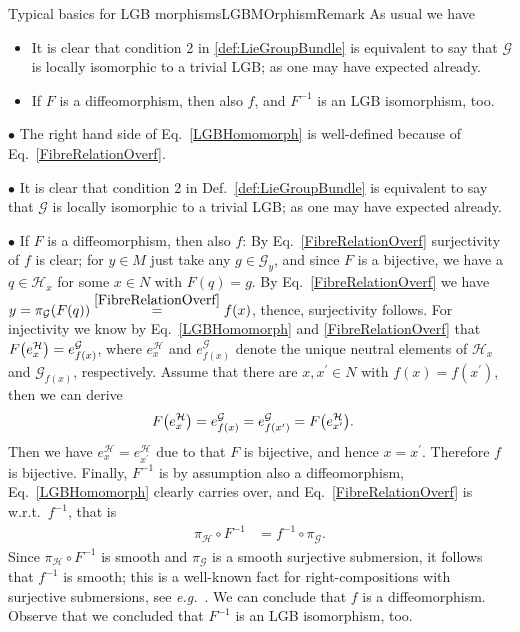 \documentclass[reqno,a4paper,oneside]{amsart}
\newcounter{access}
\theoremstyle{plain}
\theoremstyle{remark}
\theoremstyle{definition}
\begin{document}
\begin{remarks}{Typical basics for LGB morphisms}{LGBMOrphismRemark}
As usual we have
\begin{itemize}
	\item It is clear that condition 2 in \ref{def:LieGroupBundle} is equivalent to say that $\mathcal{G}$ is locally isomorphic to a trivial LGB; as one may have expected already.

	\item If $F$ is a diffeomorphism, then also $f$, and $F^{-1}$ is an LGB isomorphism, too.
\end{itemize}
\ifnum{}
\indent $\bullet$ The right hand side of Eq.\ \eqref{LGBHomomorph} is well-defined because of Eq.\ \eqref{FibreRelationOverf}.

$\bullet$ It is clear that condition 2 in Def.\ \ref{def:LieGroupBundle} is equivalent to say that $\mathcal{G}$ is locally isomorphic to a trivial LGB; as one may have expected already.

$\bullet$ If $F$ is a diffeomorphism, then also $f$: By Eq.\ \eqref{FibreRelationOverf} surjectivity of $f$ is clear; for $y \in M$ just take any $g \in \mathcal{G}_y$, and since $F$ is a bijective, we have a $q \in \mathcal{H}_x$ for some $x\in N$ with $F(q)=g$. By Eq.\ \eqref{FibreRelationOverf} we have $y = \pi_{\mathcal{G}}(F(q)) \stackrel{\eqref{FibreRelationOverf}}{=} f(x)$, thence, surjectivity follows. For injectivity we know by Eq.\ \eqref{LGBHomomorph} and \eqref{FibreRelationOverf} that $F\mleft(e^{\mathcal{H}}_x\mright) = e^{\mathcal{G}}_{f(x)}$, where $e^{\mathcal{H}}_x$ and $e^{\mathcal{G}}_{f(x)}$ denote the unique neutral elements of $\mathcal{H}_x$ and $\mathcal{G}_{f(x)}$, respectively. Assume that there are $x, x^\prime \in N$ with $f(x) = f(x^\prime)$, then we can derive
\begin{align*}
F\mleft(e^{\mathcal{H}}_x\mright)
&=
e^{\mathcal{G}}_{f(x)}
=
e^{\mathcal{G}}_{f(x^\prime)}
=
F\mleft(e^{\mathcal{H}}_{x^\prime}\mright).
\end{align*}
Then we have $e^{\mathcal{H}}_x = e^{\mathcal{H}}_{x^\prime}$ due to that $F$ is bijective, and hence $x = x^\prime$. Therefore $f$ is bijective. Finally, $F^{-1}$ is by assumption also a diffeomorphism, Eq.\ \eqref{LGBHomomorph} clearly carries over, and Eq.\ \eqref{FibreRelationOverf} is w.r.t.\ $f^{-1}$, that is
\begin{align*}
\pi_{\mathcal{H}} \circ F^{-1} &= f^{-1} \circ \pi_{\mathcal{G}}.
\end{align*}
Since $\pi_{\mathcal{H}} \circ F^{-1}$ is smooth and $\pi_{\mathcal{G}}$ is a smooth surjective submersion, it follows that $f^{-1}$ is smooth; this is a well-known fact for right-compositions with surjective submersions, see \textit{e.g.}\ \cite[\S 3.7.2, Lemma 3.7.5, page 153]{Hamilton}. We can conclude that $f$ is a diffeomorphism. Observe that we concluded that $F^{-1}$ is an LGB isomorphism, too.
\fi
\end{remarks}
\end{document}
